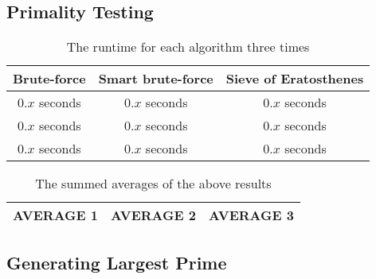 \documentclass[main.tex]{subfiles}
\begin{document}
\subsection{Primality Testing}

\begin{table}[ht!]
    \centering
    \begin{tabular}{||c c c||} 
        \hline
        Brute-force & Smart brute-force & Sieve of Eratosthenes \\ [0.5ex] 
        \hline\hline
        $0.x$ seconds  & $0.x$ seconds & $0.x$ seconds  \\ 
        $0.x$ seconds & $0.x$ seconds & $0.x$ seconds  \\
        $0.x$ seconds & $0.x$ seconds & $0.x$ seconds  \\ [1ex] 
        \hline
    \end{tabular}
    \caption{The runtime for each algorithm three times}
\end{table}

\begin{table}[ht!]
    \centering
    \begin{tabular}{||c c c||} 
        \hline
        AVERAGE 1 & AVERAGE 2 & AVERAGE 3  \\ [0.5ex] 
        \hline
    \end{tabular}
    \caption{The summed averages of the above results}
\end{table}


\subsection{Generating Largest Prime}
\end{document}
